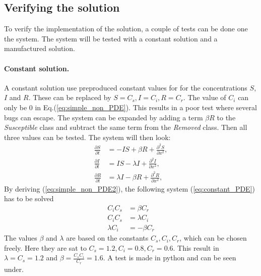 \documentclass[%
twoside,                 %
final,                   %
10pt]{article}
\begin{document}
\subsection{Verifying the solution}
To verify the implementation of the solution, a couple of tests can be done one the system. The system will be tested with a constant solution and a manufactured solution.   

\paragraph{Constant solution.}
A constant solution use preproduced constant values for for the concentrations $S$, $I$ and $R$. These can be replaced by $S = C_s,I=C_i,R=C_r$. The value of $C_i$ can only be 0 in Eq.(\ref{eq:simple_non_PDE}). This results in a poor test where several bugs can escape. The system can be expanded by adding a term $\beta R$ to the \emph{Susceptible} class and subtract the same term from the \emph{Removed} class. Then all three values can be tested. The system will then look: 
\begin{equation} \label{eq:simple_non_PDE2}
	\begin{aligned}
	\frac{\partial S}{\partial t} &= -IS + \beta R + \frac{\partial^2 S}{\partial x^2},\\
	\frac{\partial I}{\partial t} &= IS- \lambda I + \frac{\partial^2 I}{\partial x^2},\\
	\frac{\partial R}{\partial t} &= \lambda I - \beta R + \frac{\partial^2 R}{\partial x^2},
	\end{aligned}
\end{equation}
By deriving (\ref{eq:simple_non_PDE2}), the following system (\ref{eq:constant_PDE}) has to be solved
\begin{equation} \label{eq:constant_PDE}
	\begin{aligned}
	C_iC_s &= \beta C_r \\
	C_iC_s &= \lambda C_i \\
	\lambda C_i &= -\beta C_r 
	\end{aligned}
\end{equation}
The values $\beta$ and $\lambda$ are based on the constants $C_s,C_i,C_r$, which can be chosen freely. Here they are sat to $C_s = 1.2,C_i=0.8,C_r=0.6$. This result in $\lambda= C_s = 1.2$ and $\beta= \frac{C_s C_i}{C_r}=1.6$. A test is made in python and can be seen under.
\end{document}
